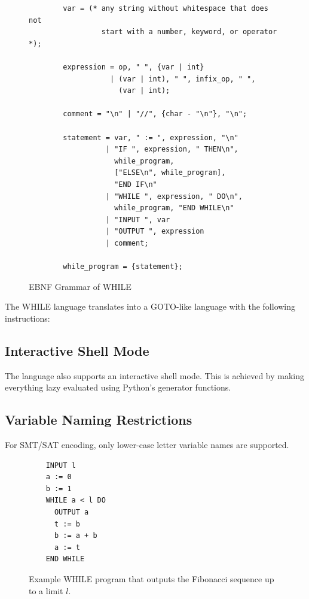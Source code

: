 \documentclass[sigconf,natbib=false]{acmart}
\begin{document}
\begin{figure}
    \centering
    \begin{verbatim}
        var = (* any string without whitespace that does not
                 start with a number, keyword, or operator *);
                 
        expression = op, " ", {var | int}
                   | (var | int), " ", infix_op, " ",
                     (var | int);
                   
        comment = "\n" | "//", {char - "\n"}, "\n";
                
        statement = var, " := ", expression, "\n"
                  | "IF ", expression, " THEN\n",
                    while_program,
                    ["ELSE\n", while_program],
                    "END IF\n"
                  | "WHILE ", expression, " DO\n",
                    while_program, "END WHILE\n"
                  | "INPUT ", var
                  | "OUTPUT ", expression
                  | comment;
                  
        while_program = {statement};
    \end{verbatim}
    \caption{EBNF Grammar of WHILE}
    \label{fig:while_grammar}
\end{figure}

The WHILE language translates into a GOTO-like language with the following instructions:\\

\subsection{Interactive Shell Mode}
The language also supports an interactive shell mode. This is achieved by making everything lazy evaluated using Python's generator functions.

\subsection{Variable Naming Restrictions}
For SMT/SAT encoding, only lower-case letter variable names are supported.

\begin{figure}
    \centering
    \begin{verbatim}
    INPUT l
    a := 0
    b := 1
    WHILE a < l DO
      OUTPUT a
      t := b
      b := a + b
      a := t
    END WHILE
    \end{verbatim}
    \caption{Example WHILE program that outputs the Fibonacci sequence up to a limit \( l \).}
    \label{fig:example_while_fibonacci}
\end{figure}
\end{document}
